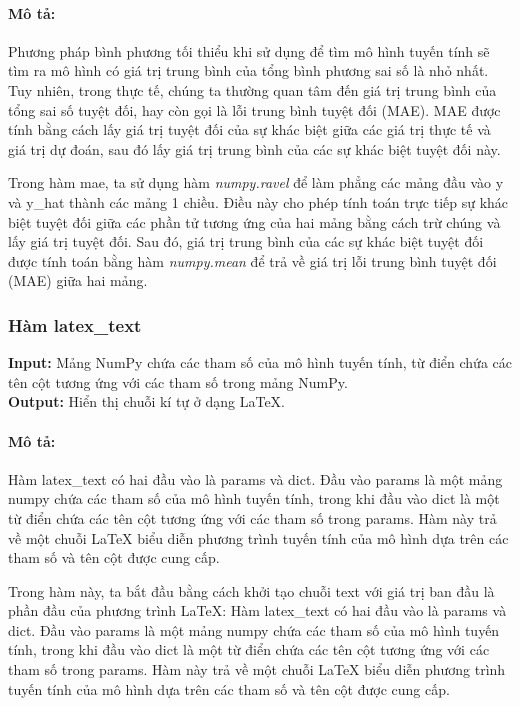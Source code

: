 \documentclass[]{article}
\begin{document}
\paragraph{Mô tả:}

Phương pháp bình phương tối thiểu khi sử dụng để tìm mô hình tuyến tính sẽ tìm ra mô hình có giá trị trung bình của tổng bình phương sai số là nhỏ nhất.  Tuy nhiên, trong thực tế, chúng ta thường quan tâm đến giá trị trung bình của tổng sai số tuyệt đối, hay còn gọi là lỗi trung bình tuyệt đối (MAE). MAE được tính bằng cách lấy giá trị tuyệt đối của sự khác biệt giữa các giá trị thực tế và giá trị dự đoán, sau đó lấy giá trị trung bình của các sự khác biệt tuyệt đối này.

Trong hàm mae, ta sử dụng hàm \textit{numpy.ravel} để làm phẳng các mảng đầu vào y và y\_hat thành các mảng 1 chiều. Điều này cho phép tính toán trực tiếp sự khác biệt tuyệt đối giữa các phần tử tương ứng của hai mảng bằng cách trừ chúng và lấy giá trị tuyệt đối. Sau đó, giá trị trung bình của các sự khác biệt tuyệt đối được tính toán bằng hàm \textit{numpy.mean} để trả về giá trị lỗi trung bình tuyệt đối (MAE) giữa hai mảng.

\subsubsection{Hàm latex\_text}
\noindent
\textbf{Input:} Mảng NumPy chứa các tham số của mô hình tuyến tính, từ điển chứa các tên cột tương ứng với các tham số trong mảng NumPy. \\
\textbf{Output:} Hiển thị chuỗi kí tự ở dạng \LaTeX.
\paragraph{Mô tả:}

Hàm latex\_text có hai đầu vào là params và dict. Đầu vào params là một mảng numpy chứa các tham số của mô hình tuyến tính, trong khi đầu vào dict là một từ điển chứa các tên cột tương ứng với các tham số trong params. Hàm này trả về một chuỗi LaTeX biểu diễn phương trình tuyến tính của mô hình dựa trên các tham số và tên cột được cung cấp.

Trong hàm này, ta bắt đầu bằng cách khởi tạo chuỗi text với giá trị ban đầu là phần đầu của phương trình LaTeX: Hàm latex\_text có hai đầu vào là params và dict. Đầu vào params là một mảng numpy chứa các tham số của mô hình tuyến tính, trong khi đầu vào dict là một từ điển chứa các tên cột tương ứng với các tham số trong params. Hàm này trả về một chuỗi LaTeX biểu diễn phương trình tuyến tính của mô hình dựa trên các tham số và tên cột được cung cấp.
\end{document}

